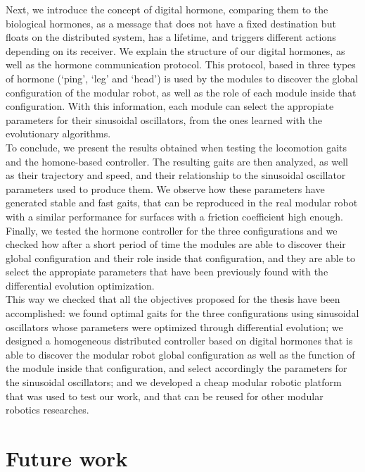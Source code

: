 Next, we introduce the concept of digital hormone, comparing them to the biological hormones, as a message that does not have a fixed destination but floats on the distributed system, has a lifetime, and triggers different actions depending on its receiver. We explain the structure of our digital hormones, as well as the hormone communication protocol. This protocol, based in three types of hormone (`ping', `leg' and `head') is used by the modules to discover the global configuration of the modular robot, as well as the role of each module inside that configuration. With this information, each module can select the appropiate parameters for their sinusoidal oscillators, from the ones learned with the evolutionary algorithms. \\

To conclude, we present the results obtained when testing the locomotion gaits and the homone-based controller. The resulting gaits are then analyzed, as well as their trajectory and speed, and their relationship to the sinusoidal oscillator parameters used to produce them. We observe how these parameters have generated stable and fast gaits, that can be reproduced in the real modular robot with a similar performance for surfaces with a friction coefficient high enough. Finally, we tested the hormone controller for the three configurations and we checked how after a short period of time the modules are able to discover their global configuration and their role inside that configuration, and they are able to select the appropiate parameters that have been previously found with the differential evolution optimization.\\

This way we checked that all the objectives proposed for the thesis have been accomplished: we found optimal gaits for the three configurations using sinusoidal oscillators whose parameters were optimized through differential evolution; we designed a homogeneous distributed controller based on digital hormones that is able to discover the modular robot global configuration as well as the function of the module inside that configuration, and select accordingly the parameters for the sinusoidal oscillators; and we developed a cheap modular robotic platform that was used to test our work, and that can be reused for other modular robotics researches. \\

\newpage
\section{Future work}
\label{future_work}

